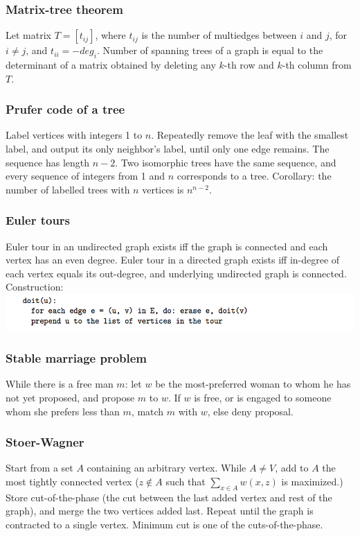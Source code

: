 \documentclass[a4paper,12pt]{article}
\begin{document}
\subsubsection{Matrix-tree theorem}
Let matrix $T = [t_{ij}]$, where $t_{ij}$ is the number of multiedges between $i$ and $j$, for $i \neq j$, and $t_{ii} = -deg_i$.
Number of spanning trees of a graph is equal to the determinant of a matrix obtained by deleting any $k$-th row and $k$-th column from $T$.

\subsubsection{Prufer code of a tree}
Label vertices with integers 1 to $n$. Repeatedly remove the leaf with the smallest label, and output its only neighbor’s label, until only one edge remains. The sequence has length $n - 2$.
Two isomorphic trees have the same sequence, and every sequence of integers from 1 and $n$ corresponds to a tree. Corollary: the number of labelled trees with $n$ vertices is $n^{n-2}$.

\subsubsection{Euler tours}
Euler tour in an undirected graph exists iff the graph is connected and each vertex has an even degree. Euler tour in a directed graph exists iff in-degree of each vertex equals its out-degree, and underlying undirected graph is connected.
Construction:\\
\includegraphics[scale=.7]{graph/euler}

\newpage
\subsubsection{Stable marriage problem}
While there is a free man $m$: let $w$ be the most-preferred woman to whom he has not yet proposed, and propose $m$ to $w$. If $w$ is free, or is engaged to someone whom she prefers less than $m$, match $m$ with $w$, else deny proposal.
\begin{multicols}{2}
  
\end{multicols}

\newpage
\subsubsection{Stoer-Wagner}
Start from a set $A$ containing an arbitrary vertex. While $A \neq V$, add to $A$ the most tightly connected vertex ($z \not\in A$ such that $\sum_{x\in A}w(x,z)$ is maximized.)
Store cut-of-the-phase (the cut between the last added vertex and rest of the graph), and merge the two vertices added last. Repeat until the graph is contracted to a single vertex. Minimum cut is one of the cuts-of-the-phase.
\begin{multicols}{2}
  
\end{multicols}
\end{document}

